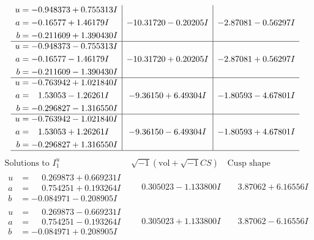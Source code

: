 \documentclass[1p]{elsarticle_modified}
\theoremstyle{definition}
\newcommand{\I}{\sqrt{-1}}
\begin{document}
$$\begin{array}{c|c|c}
\begin{aligned}
u &= -0.948373 + 0.755313 I \\
a &= -0.16577 + 1.46179 I \\
b &= -0.211609 + 1.390430 I\end{aligned}
 & -10.31720 - 0.20205 I & -2.87081 - 0.56297 I \\ \hline\begin{aligned}
u &= -0.948373 - 0.755313 I \\
a &= -0.16577 - 1.46179 I \\
b &= -0.211609 - 1.390430 I\end{aligned}
 & -10.31720 + 0.20205 I & -2.87081 + 0.56297 I \\ \hline\begin{aligned}
u &= -0.763942 + 1.021840 I \\
a &= \phantom{-}1.53053 - 1.26261 I \\
b &= -0.296827 - 1.316550 I\end{aligned}
 & -9.36150 + 6.49304 I & -1.80593 - 4.67801 I \\ \hline\begin{aligned}
u &= -0.763942 - 1.021840 I \\
a &= \phantom{-}1.53053 + 1.26261 I \\
b &= -0.296827 + 1.316550 I\end{aligned}
 & -9.36150 - 6.49304 I & -1.80593 + 4.67801 I\\
 \hline 
 \end{array}$$\newpage$$\begin{array}{c|c|c}  
\text{Solutions to }I^u_{1}& \I (\text{vol} + \sqrt{-1}CS) & \text{Cusp shape}\\
 \hline 
\begin{aligned}
u &= \phantom{-}0.269873 + 0.669231 I \\
a &= \phantom{-}0.754251 + 0.193264 I \\
b &= -0.084971 - 0.208905 I\end{aligned}
 & \phantom{-}0.305023 - 1.133800 I & \phantom{-}3.87062 + 6.16556 I \\ \hline\begin{aligned}
u &= \phantom{-}0.269873 - 0.669231 I \\
a &= \phantom{-}0.754251 - 0.193264 I \\
b &= -0.084971 + 0.208905 I\end{aligned}
 & \phantom{-}0.305023 + 1.133800 I & \phantom{-}3.87062 - 6.16556 I \\ \hline\begin{aligned}

\end{aligned}
\end{array}$$
\end{document}
